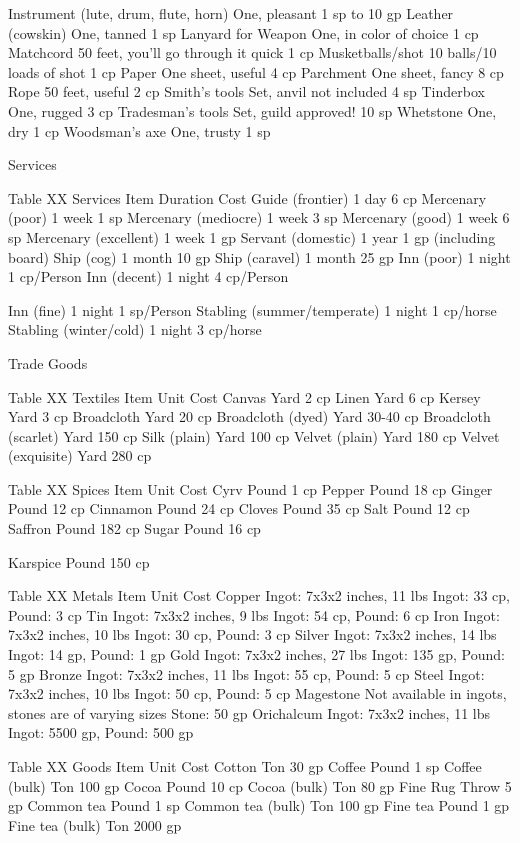 \documentclass[oneside,11pt,english]{book}
\begin{document}
Instrument (lute, drum, flute, horn) One, pleasant 1 sp to 10 gp 
Leather (cowskin) One, tanned 1 sp 
Lanyard for Weapon One, in color of choice 1 cp 
Matchcord 50 feet, you’ll go through it quick 1 cp 
Musketballs/shot 10 balls/10 loads of shot 1 cp 
Paper One sheet, useful 4 cp 
Parchment One sheet, fancy 8 cp 
Rope 50 feet, useful 2 cp 
Smith’s tools Set, anvil not included 4 sp 
Tinderbox One, rugged 3 cp 
Tradesman’s tools Set, guild approved! 10 sp 
Whetstone One, dry 1 cp 
Woodsman’s axe One, trusty 1 sp 

 

Services 

 
Table XX Services 
Item Duration Cost 
Guide (frontier) 1 day 6 cp 
Mercenary (poor) 1 week 1 sp 
Mercenary (mediocre) 1 week 3 sp 
Mercenary (good) 1 week 6 sp 
Mercenary (excellent) 1 week 1 gp 
Servant (domestic) 1 year 1 gp (including board) 
Ship (cog) 1 month 10 gp 
Ship (caravel) 1 month 25 gp 
Inn (poor) 1 night 1 cp/Person 
Inn (decent) 1 night 4 cp/Person 


Inn (fine) 1 night 1 sp/Person 
Stabling (summer/temperate) 1 night 1 cp/horse 
Stabling (winter/cold) 1 night 3 cp/horse 

 

Trade Goods 

 
Table XX Textiles 
Item Unit Cost 
Canvas Yard 2 cp 
Linen Yard 6 cp 
Kersey Yard 3 cp 
Broadcloth Yard 20 cp 
Broadcloth (dyed) Yard 30-40 cp 
Broadcloth (scarlet) Yard 150 cp 
Silk (plain) Yard 100 cp 
Velvet (plain) Yard 180 cp 
Velvet (exquisite) Yard 280 cp 

 
Table XX Spices 
Item Unit Cost 
Cyrv Pound 1 cp 
Pepper Pound 18 cp 
Ginger Pound 12 cp 
Cinnamon Pound 24 cp 
Cloves Pound 35 cp 
Salt Pound 12 cp 
Saffron Pound 182 cp 
Sugar Pound 16 cp 


Karspice Pound 150 cp 

 
Table XX Metals 
Item Unit Cost 
Copper Ingot: 7x3x2 inches, 11 lbs Ingot: 33 cp, Pound: 3 cp 
Tin Ingot: 7x3x2 inches, 9 lbs Ingot: 54 cp, Pound: 6 cp 
Iron Ingot: 7x3x2 inches, 10 lbs Ingot: 30 cp, Pound: 3 cp 
Silver Ingot: 7x3x2 inches, 14 lbs Ingot: 14 gp, Pound: 1 gp 
Gold Ingot: 7x3x2 inches, 27 lbs Ingot: 135 gp, Pound: 5 gp 
Bronze Ingot: 7x3x2 inches, 11 lbs Ingot: 55 cp, Pound: 5 cp 
Steel Ingot: 7x3x2 inches, 10 lbs Ingot: 50 cp, Pound: 5 cp 
Magestone Not available in ingots, stones are of varying sizes Stone: 50 gp 
Orichalcum Ingot: 7x3x2 inches, 11 lbs Ingot: 5500 gp, Pound: 500 gp 

 
Table XX Goods 
Item Unit Cost 
Cotton Ton 30 gp 
Coffee Pound 1 sp 
Coffee (bulk) Ton 100 gp 
Cocoa Pound 10 cp 
Cocoa (bulk) Ton 80 gp 
Fine Rug Throw 5 gp 
Common tea Pound 1 sp 
Common tea (bulk) Ton 100 gp 
Fine tea Pound 1 gp 
Fine tea (bulk) Ton 2000 gp 
\end{document}

